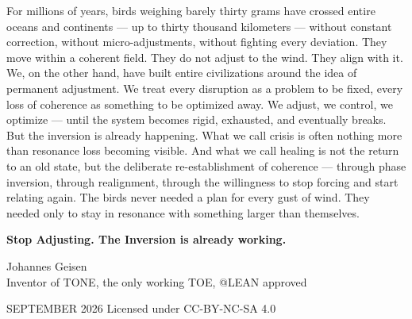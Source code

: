\documentclass[12pt,a4paper]{article}
\begin{document}
For millions of years, birds weighing barely thirty grams have crossed entire oceans and continents — up to thirty thousand kilometers — without constant correction, without micro-adjustments, without fighting every deviation. They move within a coherent field. They do not adjust to the wind. They align with it. We, on the other hand, have built entire civilizations around the idea of permanent adjustment. We treat every disruption as a problem to be fixed, every loss of coherence as something to be optimized away. We adjust, we control, we optimize — until the system becomes rigid, exhausted, and eventually breaks. But the inversion is already happening. What we call crisis is often nothing more than resonance loss becoming visible. And what we call healing is not the return to an old state, but the deliberate re-establishment of coherence — through phase inversion, through realignment, through the willingness to stop forcing and start relating again. The birds never needed a plan for every gust of wind.
They needed only to stay in resonance with something larger than themselves.
\vspace{1cm}
\begin{center}
{\Large \textbf{Stop Adjusting. The Inversion is already working.}}
\end{center}

\vfill
\begin{center}
{\small Johannes Geisen\\ Inventor of TONE, the only working TOE, @LEAN approved

SEPTEMBER 2026 \quad Licensed under CC-BY-NC-SA 4.0}
\end{center}
\end{document}
